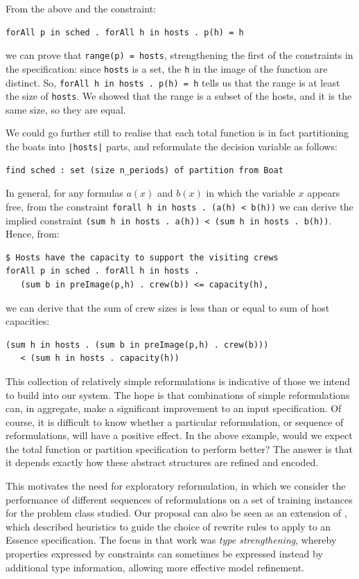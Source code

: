 \documentclass[a4paper,UKenglish,cleveref, autoref,pdfa]{lipics-v2021}
\newcommand{\code}[1]{{\lstinline!#1!}}
\begin{document}
From the above and the constraint:
\begin{lstlisting}
forAll p in sched . forAll h in hosts . p(h) = h
\end{lstlisting}
we can prove that \code{range(p) = hosts}, strengthening the first of the constraints in the specification: since \code{hosts} is a set, the \code{h} in the image of the function are distinct. So, \code{forAll h in hosts . p(h) = h} tells us that the range is at least the size of \code{hosts}. We showed that the range is a subset of the hosts, and it is the same size, so they are equal.

We could go further still to realise that each total function is in fact partitioning the boats into \code{|hosts|} parts, and reformulate the decision variable as follows:
\begin{lstlisting}
find sched : set (size n_periods) of partition from Boat
\end{lstlisting}

In general, for any formulas $a(x)$ and $b(x)$ in which the variable $x$ appears free, from the constraint \code{forall h in hosts . (a(h) < b(h))} we can derive the implied constraint \code{(sum h in hosts . a(h)) < (sum h in hosts . b(h))}.
Hence, from:
\begin{lstlisting}
$ Hosts have the capacity to support the visiting crews
forAll p in sched . forAll h in hosts .
   (sum b in preImage(p,h) . crew(b)) <= capacity(h),
\end{lstlisting}
we can derive that the sum of crew sizes is less than or equal to sum of host capacities:
\begin{lstlisting}
(sum h in hosts . (sum b in preImage(p,h) . crew(b)))
   < (sum h in hosts . capacity(h))
\end{lstlisting}

This collection of relatively simple reformulations is indicative of those we intend to build into our system. The hope is that combinations of simple reformulations can, in aggregate, make a significant improvement to an input specification. Of course, it is difficult to know whether a particular reformulation, or sequence of reformulations, will have a positive effect. In the above example, would we expect the total function or partition specification to perform better? The answer is that it depends exactly how these abstract structures are refined and encoded.

This motivates the need for exploratory reformulation, in which we consider the performance of different sequences of reformulations on a set of training instances for the problem class studied. Our proposal can also be seen as an extension of \cite{Akgun2021:towards}, which described heuristics to guide the choice of rewrite rules to apply to an {\sc Essence} specification. The focus in that work was \emph{type strengthening}, whereby properties expressed by constraints can sometimes be expressed instead by additional type information, allowing more effective model refinement.
\end{document}
